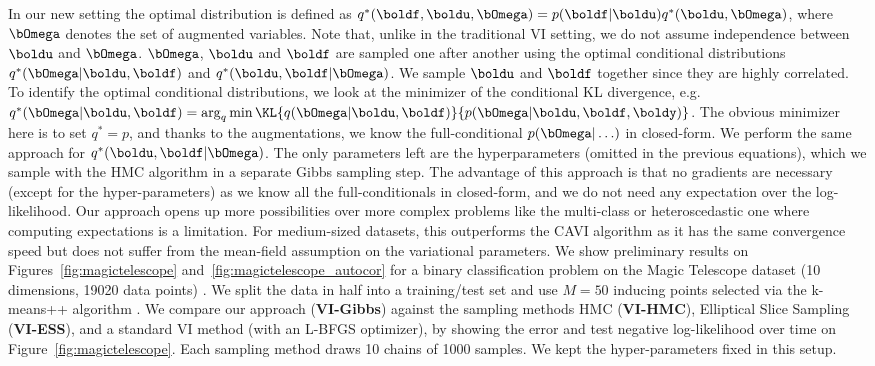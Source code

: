 In our new setting the optimal distribution is defined as $q^*(\boldf,\boldu,\bOmega) = p(\boldf|\boldu)q^*(\boldu, \bOmega)$, where $\bOmega$ denotes the set of augmented variables.
Note that, unlike in the traditional  \ac{VI} setting, we do not assume independence between $\boldu$ and $\bOmega$.
$\bOmega$, $\boldu$ and $\boldf$ are sampled one after another using the optimal conditional distributions $q^*(\bOmega|\boldu,\boldf)$ and $q^*(\boldu,\boldf|\bOmega)$.
We sample $\boldu$ and $\boldf$ together since they are highly correlated.
To identify the optimal conditional distributions, we look at the minimizer of the conditional \ac{KL} divergence, e.g. $q^*(\bOmega|\boldu,\boldf) = \arg_{q} \min \KL{q(\bOmega|\boldu,\boldf)}{p(\bOmega|\boldu,\boldf,\boldy)}$.
The obvious minimizer here is to set $q^*=p$, and thanks to the augmentations, we know the full-conditional $p(\bOmega|\ldots)$ in closed-form.
We perform the same approach for $q^*(\boldu,\boldf|\bOmega)$.
The only parameters left are the hyperparameters (omitted in the previous equations), which we sample with the \ac{HMC} algorithm in a separate Gibbs sampling step.
The advantage of this approach is that no gradients are necessary (except for the hyper-parameters) as we know all the full-conditionals in closed-form, and we do not need any expectation over the log-likelihood.
Our approach opens up more possibilities over more complex problems like the multi-class or heteroscedastic one where computing expectations is a limitation.
For medium-sized datasets, this outperforms the \ac{CAVI} algorithm as it has the same convergence speed but does not suffer from the mean-field assumption on the variational parameters.
We show preliminary results on Figures~\ref{fig:magictelescope} and~\ref{fig:magictelescope_autocor} for a binary classification problem on the Magic Telescope dataset (10 dimensions, 19020 data points) \cite{bock2004methods}.
We split the data in half into a training/test set and use $M=50$ inducing points selected via the k-means++ algorithm \cite{arthur2007k}.
We compare our approach (\textbf{VI-Gibbs}) against the sampling methods \ac{HMC} (\textbf{VI-HMC}), Elliptical Slice Sampling (\textbf{VI-ESS}), and a standard \ac{VI} method (with an L-BFGS optimizer), by showing the error and test negative log-likelihood over time on Figure~\ref{fig:magictelescope}.
Each sampling method draws 10 chains of 1000 samples.
We kept the hyper-parameters fixed in this setup.

